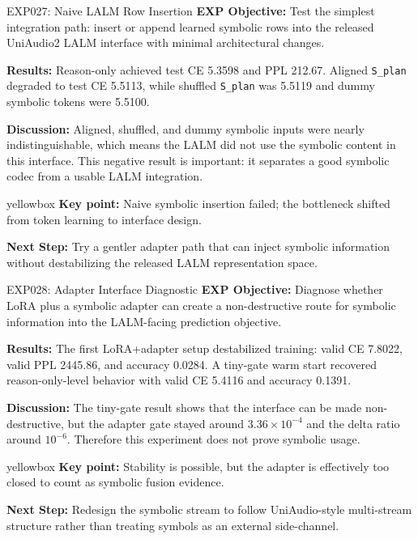 \documentclass[aspectratio=169,11pt]{beamer}
\newcommand{\code}[1]{\texttt{\footnotesize #1}}
\newcommand{\expfield}[2]{\textbf{#1:} #2\par\vspace{0.10cm}}
\newenvironment{keybox}{%
  \begin{beamercolorbox}[rounded=true,sep=0.14cm,wd=\linewidth]{yellowbox}\footnotesize%
}{%
  \end{beamercolorbox}%
}
\begin{document}
\begin{frame}{EXP027: Naive LALM Row Insertion}
  \footnotesize
  \expfield{EXP Objective}{Test the simplest integration path: insert or append learned symbolic rows into the released UniAudio2 LALM interface with minimal architectural changes.}
  \expfield{Results}{Reason-only achieved test CE 5.3598 and PPL 212.67. Aligned \code{S\_plan} degraded to test CE 5.5113, while shuffled \code{S\_plan} was 5.5119 and dummy symbolic tokens were 5.5100.}
  \expfield{Discussion}{Aligned, shuffled, and dummy symbolic inputs were nearly indistinguishable, which means the LALM did not use the symbolic content in this interface. This negative result is important: it separates a good symbolic codec from a usable LALM integration.}
  \begin{keybox}\textbf{Key point:} Naive symbolic insertion failed; the bottleneck shifted from token learning to interface design.\end{keybox}
  \vspace{0.18cm}
  \expfield{Next Step}{Try a gentler adapter path that can inject symbolic information without destabilizing the released LALM representation space.}
\end{frame}

\begin{frame}{EXP028: Adapter Interface Diagnostic}
  \footnotesize
  \expfield{EXP Objective}{Diagnose whether LoRA plus a symbolic adapter can create a non-destructive route for symbolic information into the LALM-facing prediction objective.}
  \expfield{Results}{The first LoRA+adapter setup destabilized training: valid CE 7.8022, valid PPL 2445.86, and accuracy 0.0284. A tiny-gate warm start recovered reason-only-level behavior with valid CE 5.4116 and accuracy 0.1391.}
  \expfield{Discussion}{The tiny-gate result shows that the interface can be made non-destructive, but the adapter gate stayed around $3.36 \times 10^{-4}$ and the delta ratio around $10^{-6}$. Therefore this experiment does not prove symbolic usage.}
  \begin{keybox}\textbf{Key point:} Stability is possible, but the adapter is effectively too closed to count as symbolic fusion evidence.\end{keybox}
  \vspace{0.18cm}
  \expfield{Next Step}{Redesign the symbolic stream to follow UniAudio-style multi-stream structure rather than treating symbols as an external side-channel.}
\end{frame}
\end{document}
